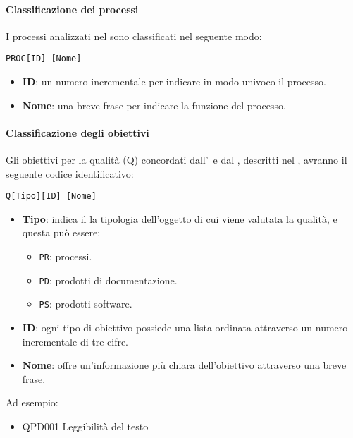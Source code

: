 			\paragraph{Classificazione dei processi}
			I processi analizzati nel \Doc{\PdQv} sono classificati nel seguente modo:

			\begin{center}
				\texttt{PROC[ID] [Nome]}
			\end{center}

			\begin{itemize}
				\item \textbf{ID}: un numero incrementale per indicare in modo univoco il processo.
				\item \textbf{Nome}: una breve frase per indicare la funzione del processo.
			\end{itemize}

			\paragraph{Classificazione degli obiettivi}
			Gli obiettivi per la qualità (Q) concordati dall'\Amm\ e dal \Ver, descritti nel \PdQ, avranno il seguente codice identificativo:

			\begin{center}
				\texttt{Q[Tipo][ID] [Nome]}
			\end{center}

			\begin{itemize}
				\item \textbf{Tipo}: indica il la tipologia dell'oggetto di cui viene valutata la qualità, e questa può essere:
				\begin{itemize}
					\item \texttt{PR}: processi.
					\item \texttt{PD}: prodotti di documentazione.
					\item \texttt{PS}: prodotti software.
				\end{itemize}

				\item \textbf{ID}: ogni tipo di obiettivo possiede una lista ordinata attraverso un numero incrementale di tre cifre.
				\item \textbf{Nome}: offre un'informazione più chiara dell'obiettivo attraverso una breve frase.
			\end{itemize}

			Ad esempio:

			\begin{itemize}
				\item QPD001 Leggibilità del testo
			\end{itemize}



